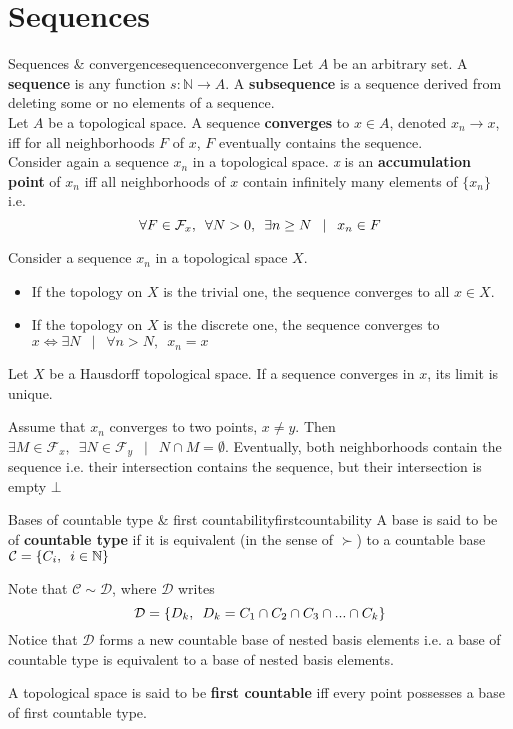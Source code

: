 \section{Sequences}\label{sec:sequences}
\begin{mydef}{Sequences \& convergence}{sequenceconvergence}
	Let $A$ be an arbitrary set. A \textbf{sequence} is any function $s : \mathbb{N} \to A$. \enspace A \textbf{subsequence} is a sequence derived from deleting some or no elements of a sequence.\\[1mm]
	Let $A$ be a topological space. A sequence \textbf{converges} to $x \in A$, denoted $x_n \to x$, iff for all neighborhoods $F$ of $x$, $F$ eventually contains the sequence.\\[1mm]
	Consider again a sequence $x_n$ in a topological space. \textit{x} is an \textbf{accumulation point} of $x_n$ iff all neighborhoods of $x$ contain infinitely many elements of $\{x_n\}$ i.e.
	$$ \forall F \in \mathcal{F}_x, \enskip \forall N > 0, \enspace \exists n \geq N \enspace \mid \enspace x_n \in F$$

\end{mydef}
\begin{myeg}{}
	Consider a sequence $x_n$ in a topological space $X$.
	\begin{itemize}
		\item If the topology on $X$ is the trivial one, the sequence converges to all $x \in X$.
		\item If the topology on $X$ is the discrete one, the sequence converges to $x \iff \exists N \enspace \mid \enspace \forall n>N, \enspace x_n = x $
	\end{itemize}
\end{myeg}
\begin{mystatement} 
	Let $X$ be a Hausdorff topological space. If a sequence converges in $x$, its limit is unique.
\end{mystatement}
\begin{myproof}
	Assume that $x_n$ converges to two points, $x \neq y$. Then $\exists M \in \mathcal{F}_x, \enspace \exists N \in \mathcal{F}_y \enspace \mid \enspace N\cap M = \emptyset{}$. Eventually, both neighborhoods contain the sequence i.e. their intersection contains the sequence, but their intersection is empty $\bot$
\end{myproof}
\begin{mydef}{Bases of countable type \& first countability}{firstcountability}
	A base is said to be of \textbf{countable type} if it is equivalent (in the sense of $\succ$) to a countable base $\mathcal{C} = \{C_i, \enskip i \in \mathbb{N} \}$
	\vspace{1mm}
	\begin{myremark} 
		Note that $\mathcal{C} \sim \mathcal{D}$, where $\mathcal{D}$ writes
		$$ \mathcal{D} = \{D_k, \enskip D_k = C_1 \cap C_2 \cap C_3 \cap ... \cap C_k\}$$
		Notice that $\mathcal{D}$ forms a new countable base of nested basis elements i.e. a base of countable type is equivalent to a base of nested basis elements.
	\end{myremark}
	A topological space is said to be \textbf{first countable} iff every point possesses a base of first countable type.
\end{mydef}
